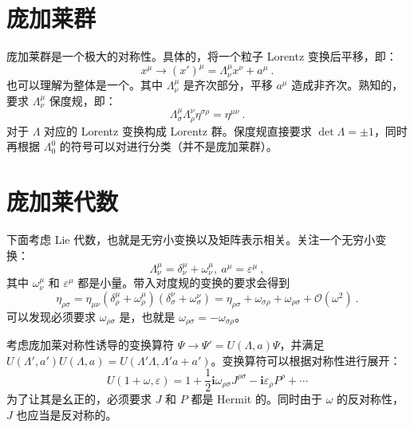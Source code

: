 
\section{庞加莱群}
庞加莱群是一个极大的对称性。具体的，将一个粒子 Lorentz 变换后平移，即：
\begin{equation}
	x^\mu \rightarrow (x')^\mu = \Lambda_{\nu}^\mu x^\nu + a^\mu ~.
\end{equation}
也可以理解为整体是一个。其中 $\Lambda_{\nu}^\mu$ 是齐次部分，平移 $a^\mu$ 造成非齐次。熟知的，要求 $\Lambda_{\nu}^\mu$ 保度规，即：
\begin{equation}
	\Lambda_{\sigma}^\mu \Lambda_{\rho}^\nu \eta^{\sigma \rho} = \eta^{\mu \nu} ~.
\end{equation}
对于 $\Lambda$ 对应的 Lorentz 变换构成 Lorentz 群。保度规直接要求 $\det \Lambda = \pm 1$，同时再根据 $\Lambda^0_0$ 的符号可以对进行分类（并不是庞加莱群）。

\section{庞加莱代数}
下面考虑 Lie 代数，也就是无穷小变换以及矩阵表示相关。关注一个无穷小变换：
\begin{equation}
	\Lambda_\nu^\mu = \delta_\nu^\mu + \omega_\nu^\mu , ~ a^\mu = \varepsilon^\mu ~,
\end{equation}
其中 $\omega^\mu_\nu$ 和 $\varepsilon^\mu$ 都是小量。带入对度规的变换的要求会得到
\begin{equation}
	\eta_{\rho\sigma} = \eta_{\mu\nu}(\delta^\mu_\rho + \omega^\mu_\rho) (\delta^\nu_\sigma + \omega^\nu_\sigma) = \eta_{\rho\sigma} + \omega_{\sigma\rho} + \omega_{\rho\sigma} + \mathcal O(\omega^2) ~.
\end{equation}
可以发现必须要求 $\omega_{\rho \sigma}$ 是，也就是 $\omega_{\rho \sigma} = -\omega_{\sigma \rho}$。

考虑庞加莱对称性诱导的变换算符 $\Psi \to \Psi' = U(\Lambda, a) \Psi$，并满足 $U(\Lambda', a') U(\Lambda, a) = U(\Lambda' \Lambda, \Lambda' a + a')$。变换算符可以根据对称性进行展开：
\begin{equation}
	U(1+\omega, \varepsilon) = 1 + \frac{1}{2} \mathbf{i} \omega_{\rho \sigma} J^{\rho \sigma} - \mathbf{i} \varepsilon_\rho P^\rho + \cdots
\end{equation}
为了让其是幺正的，必须要求 $J$ 和 $P$ 都是 Hermit 的。同时由于 $\omega$ 的反对称性，$J$ 也应当是反对称的。


